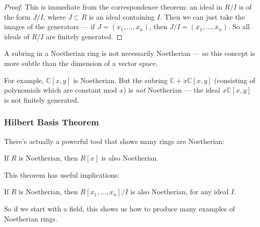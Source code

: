 \begin{proof}
    This is immediate from the correspondence theorem: an ideal in $R/I$ is of the form $J/I$, where $J \subset R$ is an ideal containing $I$. Then we can just take the images of the generators --- if $J = (x_1, \ldots, x_n)$, then $J/I = (\overline{x}_1, \ldots, \overline{x}_n)$. So all ideals of $R/I$ are finitely generated. 
\end{proof}

\begin{note}
    A subring in a Noetherian ring is not necessarily Noetherian --- so this concept is more subtle than the dimension of a vector space. 

    For example, $\mathbb{C}[x, y]$ is Noetherian. But the subring $\mathbb{C} + x\mathbb{C}[x, y]$ (consisting of polynomials which are constant mod $x$) is \emph{not} Noetherian --- the ideal $x\mathbb{C}[x, y]$ is not finitely generated. 
\end{note}

\subsubsection{Hilbert Basis Theorem}

There's actually a powerful tool that shows many rings are Noetherian: 

\begin{theorem} \label{hilbertbasis}
    If $R$ is Noetherian, then $R[x]$ is also Noetherian. 
\end{theorem}


This theorem has useful implications:

\begin{corollary}
    If $R$ is Noetherian, then $R[x_1, \ldots, x_n]/I$ is also Noetherian, for any ideal $I$. 
\end{corollary}

So if we start with a field, this shows us how to produce many examples of Noetherian rings. 

